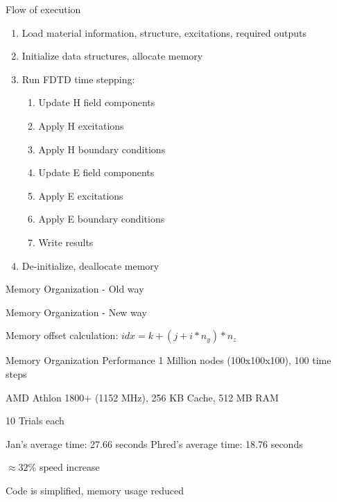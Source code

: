 \documentclass[pdf, nototal, slideBW]{prosper}
\newcommand{\insgraphic}[2]{
  \begin{center}
    \scalebox{#1}{
      \texttt{[image: \#2]}
    }
  \end{center}
}
\begin{document}
\begin{slide}{Flow of execution}
  \begin{enumerate}
  \item Load material information, structure, excitations, required
    outputs
  \item Initialize data structures, allocate memory
  \item Run FDTD time stepping:
    \begin{enumerate}
    \item Update H field components
    \item Apply H excitations
    \item Apply H boundary conditions
    \item Update E field components
    \item Apply E excitations
    \item Apply E boundary conditions
    \item Write results
    \end{enumerate}
  \item De-initialize, deallocate memory
  \end{enumerate}
\end{slide}

\begin{slide}{Memory Organization - Old way}
  \insgraphic{1}{jan-memory.eps}
\end{slide}

\begin{slide}{Memory Organization - New way}
  \insgraphic{1}{phred-memory.eps}

  Memory offset calculation: $idx = k + (j + i * n_y) * n_z$
\end{slide}

\begin{slide}{Memory Organization Performance}
  1 Million nodes (100x100x100), 100 time steps
  \vspace{0.5cm}

  AMD Athlon 1800+ (1152 MHz), 256 KB Cache, 512 MB RAM
  \vspace{0.5cm}
  
  10 Trials each
  \vspace{0.5cm}

  Jan's average time: 27.66 seconds
  Phred's average time: 18.76 seconds
  \vspace{0.5cm}

  $\approx 32\%$ speed increase
  \vspace{0.5cm}

  Code is simplified, memory usage reduced
\end{slide}
\end{document}
